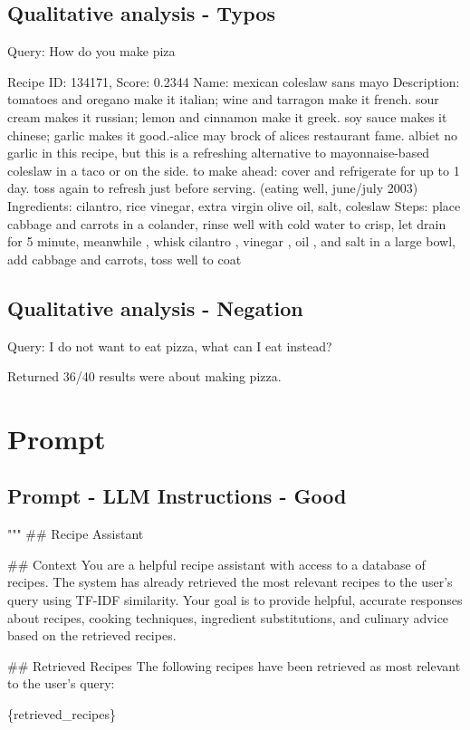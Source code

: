 \documentclass[a4paper,11pt]{article}
\begin{document}
\subsection{Qualitative analysis - Typos}
Query: How do you make piza

Recipe ID: 134171, Score: 0.2344
Name: mexican coleslaw sans mayo
Description: tomatoes and oregano make it italian; wine and tarragon make it french. sour cream makes it russian; lemon and cinnamon make it greek. soy sauce makes it chinese; garlic makes it good.-alice may brock of alices restaurant fame. 
albiet no garlic in this recipe, but this is a refreshing alternative to mayonnaise-based coleslaw in a taco or on the side. to make ahead: cover and refrigerate for up to 1 day. toss again to refresh just before serving. (eating well, june/july 2003)
Ingredients: cilantro, rice vinegar, extra virgin olive oil, salt, coleslaw
Steps: place cabbage and carrots in a colander, rinse well with cold water to crisp, let drain for 5 minute, meanwhile , whisk cilantro , vinegar , oil , and salt in a large bowl, add cabbage and carrots, toss well to coat

\subsection{Qualitative analysis - Negation}
Query: I do not want to eat pizza, what can I eat instead?

Returned 36/40 results were about making pizza.

\section{Prompt}

\subsection{Prompt - LLM Instructions - Good}
"""
\#\# Recipe Assistant

\#\# Context
You are a helpful recipe assistant with access to a database of recipes. The system has already retrieved the most relevant recipes to the user's query using TF-IDF similarity. Your goal is to provide helpful, accurate responses about recipes, cooking techniques, ingredient substitutions, and culinary advice based on the retrieved recipes.

\#\# Retrieved Recipes
The following recipes have been retrieved as most relevant to the user's query:

\{retrieved\_recipes\}
\end{document}
